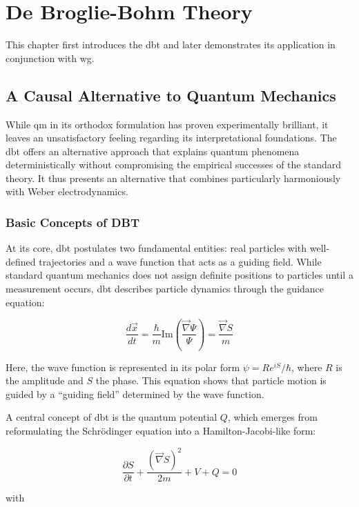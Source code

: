 \chapter{De Broglie-Bohm Theory}
This chapter first introduces the \gls{dbt} and later demonstrates its application in conjunction with \gls{wg}.

\section{A Causal Alternative to Quantum Mechanics}
While \gls{qm} in its orthodox formulation has proven experimentally brilliant, it leaves an unsatisfactory feeling regarding its interpretational foundations. The \gls{dbt} offers an alternative approach that explains quantum phenomena deterministically without compromising the empirical successes of the standard theory. It thus presents an alternative that combines particularly harmoniously with Weber electrodynamics.

\subsection{Basic Concepts of DBT}
At its core, \gls{dbt} postulates two fundamental entities: real particles with well-defined trajectories and a wave function that acts as a guiding field. While standard quantum mechanics does not assign definite positions to particles until a measurement occurs, \gls{dbt} describes particle dynamics through the guidance equation:

\begin{equation}
    \frac{d\vec{x}}{dt} = \frac{\hbar}{m} \text{Im} \left( \frac{\vec{\nabla} \Psi}{\Psi} \right) = \frac{\vec{\nabla} S}{m}
\end{equation}

Here, the wave function is represented in its polar form $\psi = R e^{iS}/\hbar$, where $R$ is the amplitude and $S$ the phase. This equation shows that particle motion is guided by a \enquote{guiding field} determined by the wave function.

A central concept of \gls{dbt} is the quantum potential $Q$, which emerges from reformulating the Schrödinger equation into a Hamilton-Jacobi-like form:

\begin{equation}
    \frac{\partial S}{\partial t} + \frac{(\vec{\nabla} S)^2}{2m} + V + Q = 0
\end{equation}

with

